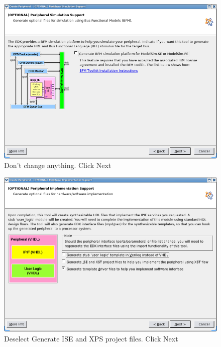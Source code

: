 \documentclass[a4paper,oneside]{memoir}
\begin{document}
\begin{figure}[H]
\centering
\includegraphics[scale=0.5]{COIP9}
\caption{Don't change anything. Click Next\label{fig:COIP9}}
\end{figure}
\begin{figure}[H]
\centering
\includegraphics[scale=0.5]{COIP10}
\caption{Deselect Generate ISE and XPS project files. Click Next\label{fig:COIP10}}
\end{figure}
\end{document}
